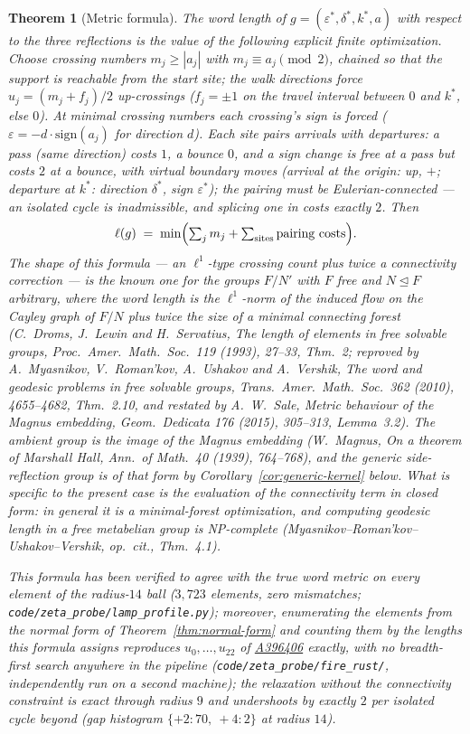 \documentclass[11pt,a4paper]{article}
\newtheorem{theorem}{Theorem}
\theoremstyle{remark}
\theoremstyle{plain}
\begin{document}
\begin{theorem}[Metric formula]
\label{thm:metric-formula}
The word length of $g = (\varepsilon^*, \delta^*, k^*, a)$ with respect
to the three reflections is the value of the following explicit
finite optimization.  Choose crossing numbers $m_j \ge |a_j|$ with
$m_j \equiv a_j \pmod 2$, chained so that the support is reachable
from the start site; the walk directions force
$u_j = (m_j + f_j)/2$ up-crossings ($f_j = \pm 1$ on the travel
interval between $0$ and $k^*$, else $0$).  At minimal crossing numbers
each crossing's sign is forced ($\varepsilon = -d \cdot
\mathrm{sign}(a_j)$ for direction $d$).  Each site pairs arrivals with
departures: a pass (same direction) costs $1$, a bounce $0$, and a
sign change is free at a pass but costs $2$ at a bounce, with virtual
boundary moves (arrival at the origin: up, $+$; departure at $k^*$:
direction $\delta^*$, sign $\varepsilon^*$); the pairing must be
Eulerian-connected --- an isolated cycle is inadmissible, and splicing
one in costs exactly $2$.  Then
\[
\ell(g) \;=\; \min \Bigl(\textstyle\sum_j m_j +
\sum_{\text{sites}} \text{pairing costs}\Bigr).
\]
The shape of this formula --- an $\ell^1$-type crossing count plus twice a
connectivity correction --- is the known one for the groups $F/N'$ with $F$
free and $N \trianglelefteq F$ arbitrary, where the word length is the
$\ell^1$-norm of the induced flow on the Cayley graph of $F/N$ plus twice
the size of a minimal connecting forest (C.~Droms, J.~Lewin and
H.~Servatius, \emph{The length of elements in free solvable groups}, Proc.\
Amer.\ Math.\ Soc.\ 119 (1993), 27--33, Thm.~2; reproved by A.~Myasnikov,
V.~Roman'kov, A.~Ushakov and A.~Vershik, \emph{The word and geodesic
problems in free solvable groups}, Trans.\ Amer.\ Math.\ Soc.\ 362 (2010),
4655--4682, Thm.~2.10, and restated by A.~W.~Sale, \emph{Metric behaviour
of the Magnus embedding}, Geom.\ Dedicata 176 (2015), 305--313,
Lemma~3.2).  The
ambient group is the image of the Magnus embedding (W.~Magnus, \emph{On a
theorem of Marshall Hall}, Ann.\ of Math.\ 40 (1939), 764--768), and the
generic side-reflection group is of that form by
Corollary~\ref{cor:generic-kernel} below.  What is specific to the present case
is the \emph{evaluation} of the connectivity term in closed form: in general
it is a minimal-forest optimization, and computing geodesic length in a free
metabelian group is NP-complete (Myasnikov--Roman'kov--Ushakov--Vershik,
\emph{op.\ cit.}, Thm.~4.1).

This formula has been verified to agree with the true word metric on
\emph{every} element of the radius-$14$ ball ($3{,}723$ elements,
zero mismatches; \texttt{code/zeta\_probe/lamp\_profile.py});
moreover, enumerating the elements from the normal form of
Theorem~\ref{thm:normal-form} and counting them by the lengths this
formula assigns reproduces $u_0, \ldots, u_{22}$ of
\href{https://oeis.org/A396406}{A396406} exactly, with no breadth-first
search anywhere in the pipeline
(\texttt{code/zeta\_probe/fire\_rust/}, independently run on a second
machine); the
relaxation without the connectivity constraint is exact through radius
$9$ and undershoots by exactly $2$ per isolated cycle beyond
(gap histogram $\{+2\colon 70,\ +4\colon 2\}$ at radius $14$).
\end{theorem}
\end{document}

